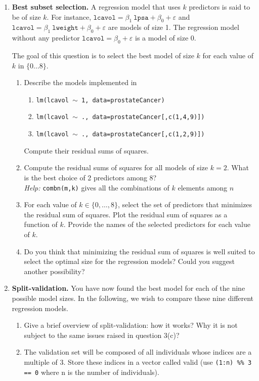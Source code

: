 \documentclass[12pt,a4paper]{article}
\newcommand{\code}[1]{\texttt{#1}}
\begin{document}
\begin{enumerate}
\item \textbf{Best subset selection.} A regression model that uses $k$ predictors is said to be of size $k$. For instance, $\texttt{lcavol} = \beta_1~\texttt{lpsa} + \beta_0 + \varepsilon$ and $\texttt{lcavol} = \beta_1~\texttt{lweight} + \beta_0 + \varepsilon$ are models of size 1. The regression model without any predictor $\texttt{lcavol} = \beta_0 + \varepsilon$ is a model of size 0.

The goal of this question is to select the best model of size $k$ for each value of $k$ in
$\{0...8\}$.
\begin{enumerate}
\item Describe the models implemented in
\begin{enumerate}
\item[] \code{lm(lcavol $\sim$ 1, data=prostateCancer)}
\item[] \code{lm(lcavol $\sim$ ., data=prostateCancer[,c(1,4,9)])} 
\item[] \code{lm(lcavol $\sim$ ., data=prostateCancer[,c(1,2,9)])}
\end{enumerate}
Compute their residual sums of squares.
\item Compute the residual sums of squares for all models of size $k = 2$. What is the best choice of 2 predictors among 8?\\
\textit{Help:} \code{combn(m,k)} gives all the combinations of $k$ elements among $n$
\item For each value of $k \in \{0, \dots, 8\}$, select the set of predictors that minimizes the residual sum of squares. Plot the residual sum of squares as a function of $k$. Provide the names of the selected predictors for each value of $k$.
\item Do you think that minimizing the residual sum of squares is well suited to select the optimal size for the regression models? Could you suggest another possibility?
\end{enumerate}
\item \textbf{Split-validation.} You have now found the best model for each of the nine possible model sizes. In the following, we wish to compare these nine different regression models. 
\begin{enumerate}
\item Give a brief overview of split-validation: how it works? Why it is not subject to the same issues raised in question 3(c)?
\item[] The validation set will be composed of all individuals whose indices are a multiple of 3. Store these indices in a vector called valid (use \code{(1:n) \%\% 3 == 0} where n is the number of individuals). 

\end{enumerate}
\end{enumerate}
\end{document}
